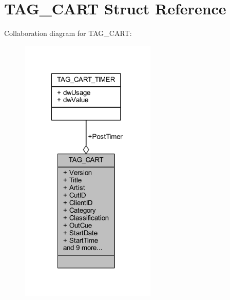 \hypertarget{struct_t_a_g___c_a_r_t}{\section{T\-A\-G\-\_\-\-C\-A\-R\-T Struct Reference}
\label{struct_t_a_g___c_a_r_t}
}


Collaboration diagram for T\-A\-G\-\_\-\-C\-A\-R\-T\-:\nopagebreak
\begin{figure}[H]
\begin{center}
\leavevmode
\includegraphics[width=184pt]{struct_t_a_g___c_a_r_t__coll__graph}
\end{center}
\end{figure}
